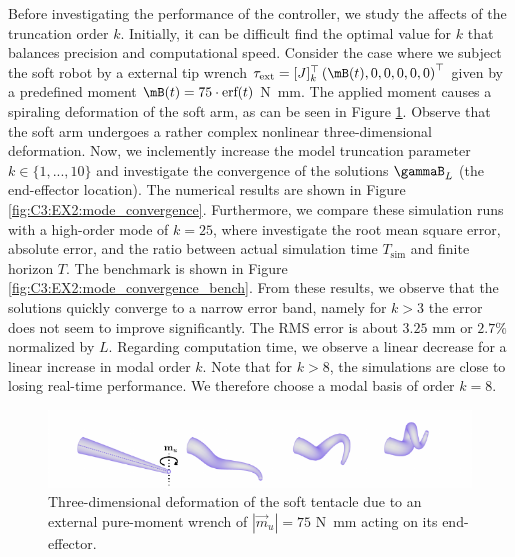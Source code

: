 \begin{example}
 Before investigating the performance of the controller, we study the affects of the truncation order $k$. Initially, it can be difficult find the optimal value for $k$ that balances precision and computational speed. Consider the case where we subject the soft robot by a external tip wrench $\tau_\textrm{ext} = [J]_k^\top \left(\mB(t),0,0,0,0,0 \right)^\top$ given by a predefined moment $\mB(t) = 75 \cdot \textrm{erf}(t)$ \si{\newton \milli \meter}. The applied moment causes a spiraling deformation of the soft arm, as can be seen in Figure \ref{fig:C3:EX2:mode_convergence_3d}. Observe that the soft arm undergoes a rather complex nonlinear three-dimensional deformation. Now, we inclemently increase the model truncation parameter $k \in \{1,...,10\}$ and investigate the convergence of the solutions $\gammaB_L$ (\ie the end-effector location). The numerical results are shown in Figure \ref{fig:C3:EX2:mode_convergence}. Furthermore, we compare these simulation runs with a high-order mode of $k = 25$, where investigate the root mean square error, absolute error, and the ratio between actual simulation time $T_{\textrm{sim}}$ and finite horizon $T$. The benchmark is shown in Figure \ref{fig:C3:EX2:mode_convergence_bench}. From these results, we observe that the solutions quickly converge to a narrow error band, namely for $k>3$ the error does not seem to improve significantly. The RMS error is about $3.25$ \si{\milli \meter} or $2.7\%$ normalized by $L$.  Regarding computation time, we observe a linear decrease for a linear increase in modal order $k$. Note that for $k > 8$, the simulations are close to losing real-time performance. We therefore choose a modal basis of order $k = 8$. 
\end{example}

\begin{figure}[!t]
\centering
% 
\includegraphics*[width=\textwidth]{./pdf/thesis-figure-5-4.pdf}
\caption{Three-dimensional deformation of the soft tentacle due to an external pure-moment wrench of $|\vec{m}_u| = 75$ \si{\newton \milli \meter} acting on its end-effector. }
\vspace{-0.2cm}
\label{fig:C3:EX2:mode_convergence_3d}
\end{figure}

